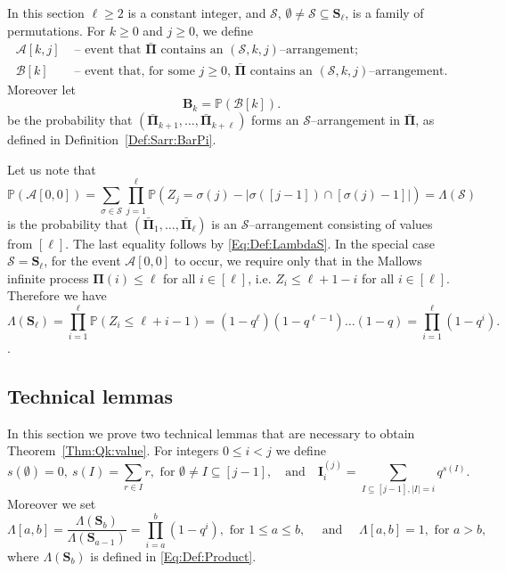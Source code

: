 \documentclass[letterpaper,11pt]{article}
\theoremstyle{definition}
\theoremstyle{remark}
\renewcommand{\le}{\leqslant}
\renewcommand{\ge}{\geqslant}
\renewcommand{\leq}{\leqslant}
\newcommand{\bS}{\mathbf{S}}
\newcommand{\product}{\Lambda}
\newcommand{\productO}{\Lambda(\cS)}
\newcommand{\sumI}{\mathbf{I}}
\newcommand{\Pra}[1]{\mathbb{P}\left(#1\right)}
\newcommand{\bB}{\mathbf{B}}
\newcommand{\cA}{\mathcal{A}}
\newcommand{\cB}{\mathcal{B}}
\newcommand{\barPi}{\bar {\mathbf \Pi}}
\newcommand{\cS}{\mathcal{S}}
\begin{document}
In this section $\ell\ge 2$ is a constant integer, 
and $\cS$, $\emptyset\neq\cS\subseteq \bS_\ell$, is a family of permutations. For $k\ge 0$ and $j\ge 0$, we define
\[
\begin{split}
	\cA[k,j] &\text{ -- event that $\barPi$ contains an $(\cS,k,j)$--arrangement};\\
	\cB[k] &\text{ -- event that, for some $j\ge 0$, $\barPi$ contains an $(\cS,k,j)$--arrangement}.
\end{split}	
\]
Moreover let
\[
\bB_{k}=\Pra{\cB[k]}.
\]
be the probability that $(\barPi_{k+1},\ldots,\barPi_{k+\ell})$ forms an $\cS$--arrangement in $\barPi$, as defined in Definition~\ref{Def:Sarr:BarPi}.

Let us note that 
\begin{equation}\label{Eq:Def:LambdaBis}
	\Pra{\cA[0,0]}=\sum_{\sigma\in \cS}\prod_{j=1}^{\ell}\Pra{Z_j=\sigma(j)-|\sigma([j-1])\cap [\sigma(j)-1]|}=\productO
\end{equation}
is the probability that $(\barPi_1,\ldots,\barPi_\ell)$ is an $\cS$--arrangement consisting of values from $[\ell]$. The last equality follows by \eqref{Eq:Def:LambdaS}.
In the special case $\cS=\bS_\ell$, for the event $\cA[0,0]$ to occur, we require only that in the Mallows infinite process ${\mathbf \Pi}(i)\le \ell$ for all $i\in [\ell]$, i.e. $Z_i\le \ell+1-i$ for all $i\in [\ell]$. Therefore we have  
\begin{equation}\label{Eq:Def:LambdaEll}
	\product(\bS_\ell)=\prod_{i=1}^{\ell}\Pra{Z_i\le \ell+i-1}=(1-q^{\ell})(1-q^{\ell-1})\ldots (1-q)=\prod_{i=1}^{\ell}(1-q^i).
\end{equation}.









\subsection{Technical lemmas}

In this section we prove two technical lemmas  that are necessary to obtain Theorem~\ref{Thm:Qk:value}.
For integers $0\leq i<j$ we define 
\begin{equation}\label{Eq:Def:SsI}
	s(\emptyset)=0,\ s(I)=\sum_{r\in I}r,\text{ for }\emptyset\neq I\subseteq [j-1],\quad\text{and}\quad \sumI^{(j)}_{i}=\sum_{I\subseteq [j-1],|I|=i}q^{s(I)}.
\end{equation}
Moreover we set
\begin{equation}
	\product[a,b]=\frac{\product(\bS_{b})}{\product(\bS_{a-1})}=\prod_{i=a}^{b}(1-q^{i}),
	\text{ for }1\le a\le b,
	\quad
	\text{ and }
	\quad
	\product[a,b]=1,
	\text{ for }a > b,
\end{equation}
where $\product(\bS_b)$ is defined in \eqref{Eq:Def:Product}. 
\end{document}

